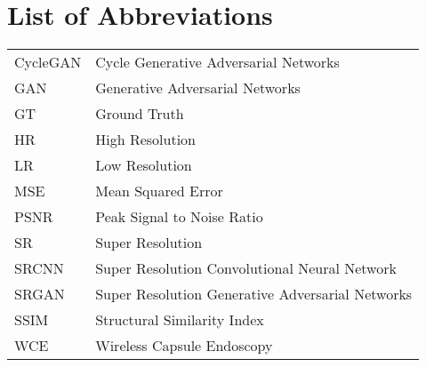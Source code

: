 
\chapter*{List of Abbreviations}

\begin{table}[!ht]
\begin{tabular}{p{2cm} l}
CycleGAN & Cycle Generative Adversarial Networks\\
GAN & Generative Adversarial Networks\\
GT & Ground Truth\\
HR & High Resolution \\
LR & Low Resolution \\
MSE & Mean Squared Error\\
PSNR & Peak Signal to Noise Ratio \\
SR & Super Resolution\\
SRCNN & Super Resolution Convolutional Neural Network\\
SRGAN & Super Resolution Generative Adversarial Networks\\
SSIM &  Structural Similarity Index \\
WCE & Wireless Capsule Endoscopy \\
\end{tabular}
\end{table}